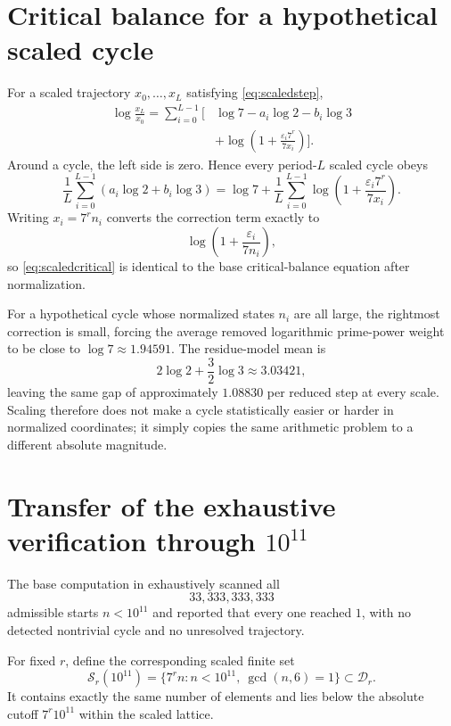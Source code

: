 \documentclass[11pt]{article}
\newcommand{\eps}{\varepsilon}
\begin{document}
\section{Critical balance for a hypothetical scaled cycle}
For a scaled trajectory $x_0,\ldots,x_L$ satisfying \eqref{eq:scaledstep},
\begin{align}
\log\frac{x_L}{x_0}
=\sum_{i=0}^{L-1}\Bigg[
&\log7-a_i\log2-b_i\log3\\
&+\log\!\left(1+\frac{\eps_i7^r}{7x_i}\right)
\Bigg].
\label{eq:scaledtelescoping}
\end{align}
Around a cycle, the left side is zero. Hence every period-$L$ scaled cycle obeys
\begin{equation}
\frac1L\sum_{i=0}^{L-1}(a_i\log2+b_i\log3)
=\log7+\frac1L\sum_{i=0}^{L-1}
\log\!\left(1+\frac{\eps_i7^r}{7x_i}\right).
\label{eq:scaledcritical}
\end{equation}
Writing $x_i=7^rn_i$ converts the correction term exactly to
\[
\log\!\left(1+\frac{\eps_i}{7n_i}\right),
\]
so \eqref{eq:scaledcritical} is identical to the base critical-balance equation after normalization.

For a hypothetical cycle whose normalized states $n_i$ are all large, the rightmost correction is small, forcing the average removed logarithmic prime-power weight to be close to $\log7\approx1.94591$. The residue-model mean is
\begin{equation}
2\log2+\frac32\log3\approx3.03421,
\label{eq:valmeanlog}
\end{equation}
leaving the same gap of approximately $1.08830$ per reduced step at every scale. Scaling therefore does not make a cycle statistically easier or harder in normalized coordinates; it simply copies the same arithmetic problem to a different absolute magnitude.

\section{Transfer of the exhaustive verification through $10^{11}$}
The base computation in \cite{Base7Paper} exhaustively scanned all
\[
33,333,333,333
\]
admissible starts $n<10^{11}$ and reported that every one reached $1$, with no detected nontrivial cycle and no unresolved trajectory.

For fixed $r$, define the corresponding scaled finite set
\begin{equation}
\mathcal S_r(10^{11})
=\{7^rn:n<10^{11},\ \gcd(n,6)=1\}\subset\mathcal D_r.
\label{eq:scaledfiniteset}
\end{equation}
It contains exactly the same number of elements and lies below the absolute cutoff $7^r10^{11}$ within the scaled lattice.
\end{document}
